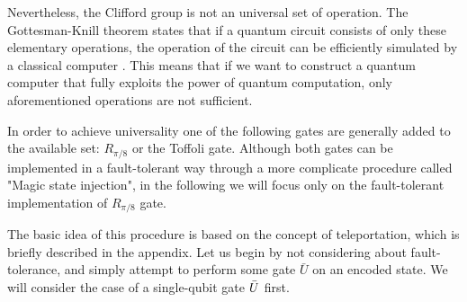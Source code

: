 Nevertheless, the Clifford group is not an universal set of operation.  
The Gottesman-Knill theorem states that if a quantum circuit consists of only these elementary operations, the operation of the circuit can be efficiently simulated by a classical computer \cite{gottesman1998heisenberg}. This means that if we want to construct a quantum computer that fully exploits the power of quantum computation, only aforementioned operations are not sufficient.

In order to achieve universality one of the following gates are generally added to the available set: $R_{\pi/8}$ or the Toffoli gate. 
Although both gates can be implemented in a fault-tolerant way through a more complicate procedure called "Magic state injection", in the following we will focus only on the fault-tolerant implementation of  $R_{\pi/8}$ gate. 

The basic idea of this procedure is based on the concept of teleportation, which is briefly described in the appendix.
Let us begin by not considering about fault-tolerance, and simply attempt to perform some gate $\bar{U}$ on an encoded state. 
We will consider the case of a single-qubit gate $\Bar{U}$ first. \cite{gottesman2009introduction}

